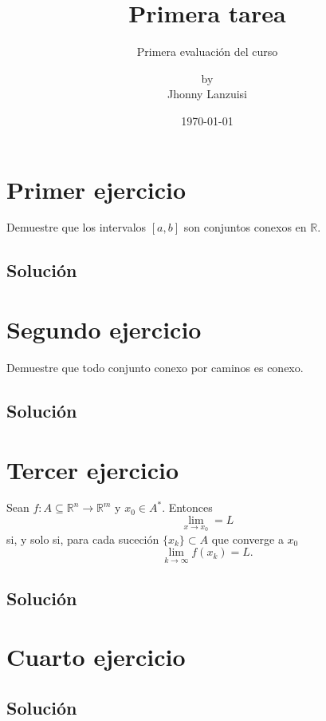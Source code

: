 \documentclass{scrartcl}
\begin{document}
%
\newcommand{\R}{\mathbb{R}}
\title{Primera tarea}
\subtitle{Primera evaluación del curso}
\subject{Análisis III}
\titlehead{Universidad Simón Bolívar\hfill Caracas, Venezuela}
\author{by \\ Jhonny Lanzuisi}
\date{\today}
\maketitle

\section{Primer ejercicio}

Demuestre que los intervalos \([a,b]\) son conjuntos conexos
en \(\R\).

\subsection{Solución}

\section{Segundo ejercicio}

Demuestre que todo conjunto conexo por caminos es conexo.

\subsection{Solución}

\section{Tercer ejercicio}

Sean \(f\colon A\subseteq\R^n\to\R^m\) y \(x_0\in A^*\).
Entonces
\[\lim_{x\to x_0} = L\]
si, y solo si, para cada suceción \(\{x_k\}\subset A\)
que converge a \(x_0\)
\[\lim_{k\to\infty} f(x_k) = L.\]

\subsection{Solución}

\section{Cuarto ejercicio}


\subsection{Solución}


\end{document}
